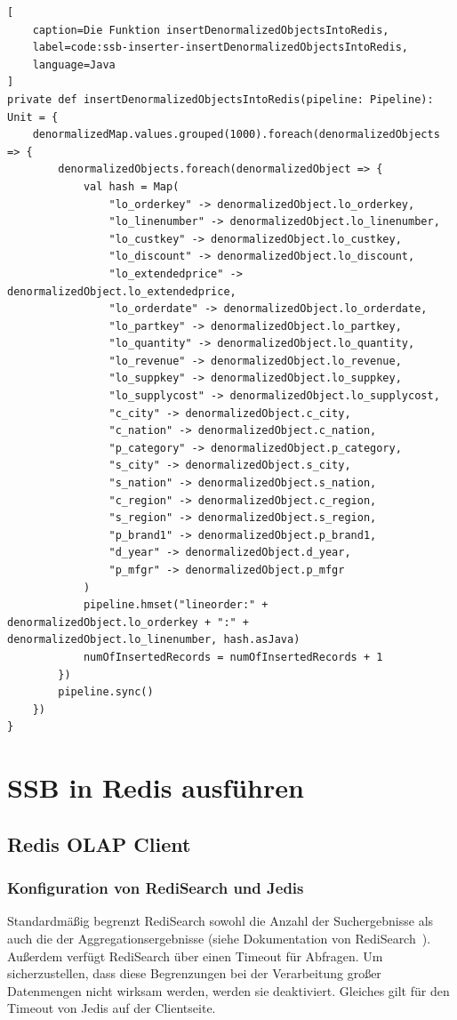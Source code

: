 \begin{lstlisting}[
    caption=Die Funktion insertDenormalizedObjectsIntoRedis,
    label=code:ssb-inserter-insertDenormalizedObjectsIntoRedis,
    language=Java
]
private def insertDenormalizedObjectsIntoRedis(pipeline: Pipeline): Unit = {
	denormalizedMap.values.grouped(1000).foreach(denormalizedObjects => {
		denormalizedObjects.foreach(denormalizedObject => {
			val hash = Map(
				"lo_orderkey" -> denormalizedObject.lo_orderkey,
				"lo_linenumber" -> denormalizedObject.lo_linenumber,
				"lo_custkey" -> denormalizedObject.lo_custkey,
				"lo_discount" -> denormalizedObject.lo_discount,
				"lo_extendedprice" -> denormalizedObject.lo_extendedprice,
				"lo_orderdate" -> denormalizedObject.lo_orderdate,
				"lo_partkey" -> denormalizedObject.lo_partkey,
				"lo_quantity" -> denormalizedObject.lo_quantity,
				"lo_revenue" -> denormalizedObject.lo_revenue,
				"lo_suppkey" -> denormalizedObject.lo_suppkey,
				"lo_supplycost" -> denormalizedObject.lo_supplycost,
				"c_city" -> denormalizedObject.c_city,
				"c_nation" -> denormalizedObject.c_nation,
				"p_category" -> denormalizedObject.p_category,
				"s_city" -> denormalizedObject.s_city,
				"s_nation" -> denormalizedObject.s_nation,
				"c_region" -> denormalizedObject.c_region,
				"s_region" -> denormalizedObject.s_region,
				"p_brand1" -> denormalizedObject.p_brand1,
				"d_year" -> denormalizedObject.d_year,
				"p_mfgr" -> denormalizedObject.p_mfgr
			)
			pipeline.hmset("lineorder:" + denormalizedObject.lo_orderkey + ":" + denormalizedObject.lo_linenumber, hash.asJava)
			numOfInsertedRecords = numOfInsertedRecords + 1
		})
		pipeline.sync()
	})
}
\end{lstlisting}



\section{SSB in Redis ausführen}\label{sec:ssb-use-in-redis}

\subsection{Redis OLAP Client}

\subsubsection{Konfiguration von RediSearch und Jedis}
Standardmäßig begrenzt RediSearch sowohl die Anzahl der Suchergebnisse als auch die der Aggregationsergebnisse (siehe Dokumentation von RediSearch~\cite{redis_ltd_configuration_nodate}). Außerdem verfügt RediSearch über einen Timeout für Abfragen. Um sicherzustellen, dass diese Begrenzungen bei der Verarbeitung großer Datenmengen nicht wirksam werden, werden sie deaktiviert.
Gleiches gilt für den Timeout von Jedis auf der Clientseite.

